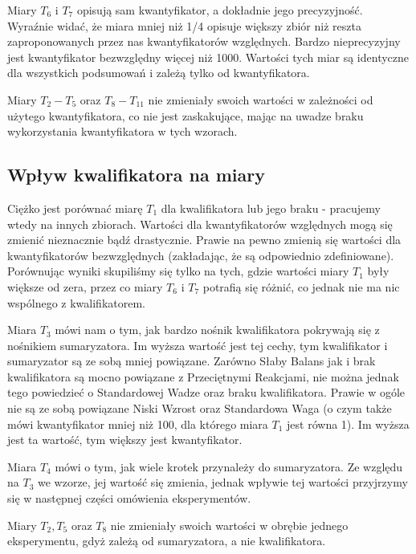\documentclass{classrep}
\begin{document}
Miary $T_6$ i $T_7$ opisują sam kwantyfikator, a dokładnie jego precyzyjność. Wyraźnie widać, że miara mniej niż 1/4 opisuje większy zbiór niż reszta zaproponowanych przez nas kwantyfikatorów względnych. Bardzo nieprecyzyjny jest kwantyfikator bezwzględny więcej niż 1000. Wartości tych miar są identyczne dla wszystkich podsumowań i zależą tylko od kwantyfikatora.
\newline

Miary $T_2-T_5$ oraz $T_8-T_{11}$ nie zmieniały swoich wartości w zależności od użytego kwantyfikatora, co nie jest zaskakujące, mając na uwadze braku wykorzystania kwantyfikatora w tych wzorach. 

\subsection{Wpływ kwalifikatora na miary}
Ciężko jest porównać miarę $T_1$ dla kwalifikatora lub jego braku - pracujemy wtedy na innych zbiorach. Wartości dla kwantyfikatorów względnych mogą się zmienić nieznacznie bądź drastycznie. Prawie na pewno zmienią się wartości dla kwantyfikatorów bezwzględnych (zakładając, że są odpowiednio zdefiniowane). Porównując wyniki skupiliśmy się tylko na tych, gdzie wartości miary $T_1$ były większe od zera, przez co miary $T_6$ i $T_7$ potrafią się różnić, co jednak nie ma nic wspólnego z kwalifikatorem.
\newline

Miara $T_3$ mówi nam o tym, jak bardzo nośnik kwalifikatora pokrywają się z nośnikiem sumaryzatora. Im wyższa wartość jest tej cechy, tym kwalifikator i sumaryzator są ze sobą mniej powiązane. Zarówno Słaby Balans jak i brak kwalifikatora są mocno powiązane z Przeciętnymi Reakcjami, nie można jednak tego powiedzieć o Standardowej Wadze oraz braku kwalifikatora. Prawie w ogóle nie są ze sobą powiązane Niski Wzrost oraz Standardowa Waga (o czym także mówi kwantyfikator mniej niż 100, dla którego miara $T_1$ jest równa 1). Im wyższa jest ta wartość, tym większy jest kwantyfikator.
\newline

Miara $T_4$ mówi o tym, jak wiele krotek przynależy do sumaryzatora. Ze względu na $T_3$ we wzorze, jej wartość się zmienia, jednak wpływie tej wartości przyjrzymy się w następnej części omówienia eksperymentów.
\newline

Miary $T_2, T_5$ oraz $T_8$ nie zmieniały swoich wartości w obrębie jednego eksperymentu, gdyż zależą od sumaryzatora, a nie kwalifikatora. 
\end{document}
